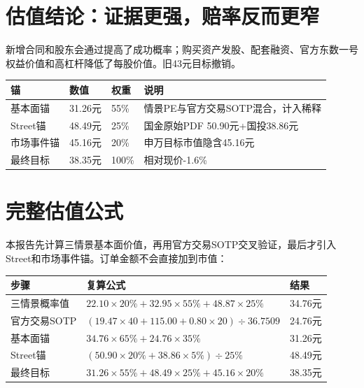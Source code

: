 \section{估值结论：证据更强，赔率反而更窄}

新增合同和股东会通过提高了成功概率；购买资产发股、配套融资、官方东数一号权益价值和高杠杆降低了每股价值。旧43元目标撤销。

\begin{exhibitbox}[估值桥]
\noindent\begin{tabularx}{\textwidth}{L{3.4cm}R{1.8cm}R{1.8cm}X}
\toprule
\textbf{锚} & \textbf{数值} & \textbf{权重} & \textbf{说明} \\
\midrule
基本面锚 & 31.26元 & 55\% & 情景PE与官方交易SOTP混合，计入稀释 \\
Street锚 & 48.49元 & 25\% & 国金原始PDF 50.90元+国投38.86元 \\
市场事件锚 & 45.16元 & 20\% & 申万目标市值隐含45.16元 \\
最终目标 & 38.35元 & 100\% & 相对现价-1.6\% \\
\bottomrule
\end{tabularx}
\end{exhibitbox}

\section{完整估值公式}

本报告先计算三情景基本面价值，再用官方交易SOTP交叉验证，最后才引入Street和市场事件锚。订单金额不会直接加到市值：

\begin{exhibitbox}[五步估值复算]
\small
\noindent\begin{tabularx}{\textwidth}{L{3.4cm}X R{1.5cm}}
\toprule
\textbf{步骤} & \textbf{复算公式} & \textbf{结果} \\
\midrule
三情景概率值 & $22.10\times20\%+32.95\times55\%+48.87\times25\%$ & 34.76元 \\
官方交易SOTP & $(19.47\times40+115.00+0.80\times20)\div36.7509$ & 24.76元 \\
基本面锚 & $34.76\times65\%+24.76\times35\%$ & 31.26元 \\
Street锚 & $(50.90\times20\%+38.86\times5\%)\div25\%$ & 48.49元 \\
最终目标 & $31.26\times55\%+48.49\times25\%+45.16\times20\%$ & 38.35元 \\
\bottomrule
\end{tabularx}
\end{exhibitbox}

